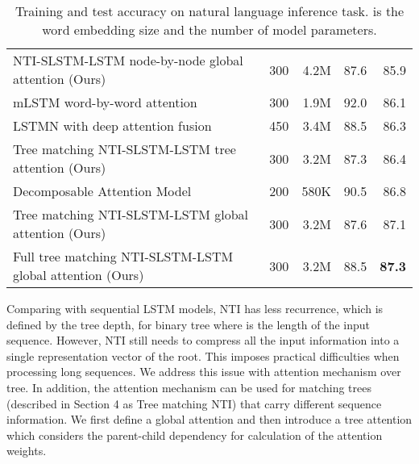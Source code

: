 \documentclass[11pt]{article}
\begin{document}
\begin{table*}[t]
\begin{center}
\begin{tabular}{c|c|c|c|c}
\multicolumn{1}{l|}{NTI-SLSTM-LSTM node-by-node global attention (Ours)} & \multicolumn{1}{|r|}{300} & \multicolumn{1}{|r|}{4.2M} & \multicolumn{1}{|r|}{87.6} & \multicolumn{1}{|r}{85.9} \\
\multicolumn{1}{l|}{mLSTM word-by-word attention \cite{WangJ15b}} & \multicolumn{1}{|r|}{300} & \multicolumn{1}{|r|}{1.9M} & \multicolumn{1}{|r|}{92.0} & \multicolumn{1}{|r}{86.1} \\
\multicolumn{1}{l|}{LSTMN with deep attention fusion \cite{ChengDL16}} & \multicolumn{1}{|r|}{450} & \multicolumn{1}{|r|}{3.4M} & \multicolumn{1}{|r|}{88.5} & \multicolumn{1}{|r}{86.3} \\
\multicolumn{1}{l|}{Tree matching NTI-SLSTM-LSTM tree attention (Ours)} & \multicolumn{1}{|r|}{300} & \multicolumn{1}{|r|}{3.2M} & \multicolumn{1}{|r|}{87.3} & \multicolumn{1}{|r}{86.4} \\
\multicolumn{1}{l|}{Decomposable Attention Model \cite{parikh2016decomposable}} & \multicolumn{1}{|r|}{200} & \multicolumn{1}{|r|}{580K} & \multicolumn{1}{|r|}{90.5} & \multicolumn{1}{|r}{86.8} \\
\multicolumn{1}{l|}{Tree matching NTI-SLSTM-LSTM global attention (Ours)} & \multicolumn{1}{|r|}{300} & \multicolumn{1}{|r|}{3.2M} & \multicolumn{1}{|r|}{87.6} & \multicolumn{1}{|r}{87.1} \\
\multicolumn{1}{l|}{Full tree matching NTI-SLSTM-LSTM global attention (Ours)} & \multicolumn{1}{|r|}{300} & \multicolumn{1}{|r|}{3.2M} & \multicolumn{1}{|r|}{88.5} & \multicolumn{1}{|r}{\textbf{87.3}} \\
\hline
\end{tabular}
\end{center}
\caption{\label{table:snli}Training and test accuracy on natural language inference task.  is the word embedding size and  the number of model parameters.}
\end{table*}

Comparing with sequential LSTM models, NTI has less recurrence, which is defined by the tree depth,  for binary tree where  is the length of the input sequence. However, NTI still needs to compress all the input information into a single representation vector of the root. This imposes practical difficulties when processing long sequences. We address this issue with attention mechanism over tree. In addition, the attention mechanism can be used for matching trees (described in Section 4 as Tree matching NTI) that carry different sequence information. We first define a global attention and then introduce a tree attention which considers the parent-child dependency for calculation of the attention weights.
\end{document}
